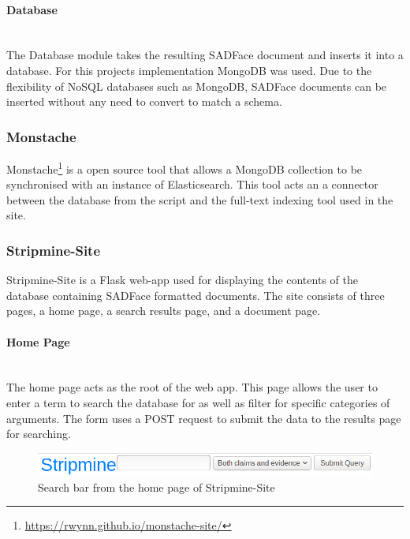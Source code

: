 \documentclass[12pt,a4paper]{article}
\begin{document}
\paragraph{Database}\mbox{}\\

The Database module takes the resulting SADFace document and inserts it into a database. For this projects implementation MongoDB was used. Due to the flexibility of NoSQL databases such as MongoDB, SADFace documents can be inserted without any need to convert to match a schema.

\subsubsection{Monstache}

Monstache\footnote{\url{https://rwynn.github.io/monstache-site/}} is a open source tool that allows a MongoDB collection to be synchronised with an instance of Elasticsearch. This tool acts an a connector between the database from the script and the full-text indexing tool used in the site. 

\subsubsection{Stripmine-Site}

Stripmine-Site is a Flask web-app used for displaying the contents of the database containing SADFace formatted documents. The site consists of three pages, a home page, a search results page, and a document page.

\paragraph{Home Page}\mbox{}\\

The home page acts as the root of the web app. This page allows the user to enter a term to search the database for as well as filter for specific categories of arguments. The form uses a POST request to submit the data to the results page for searching.

\begin{figure}[H]
    \centering
    \includegraphics[scale=0.5]{Report/graphics/home.png}
    \caption{Search bar from the home page of Stripmine-Site}
    \label{fig:home}
\end{figure}
\end{document}
